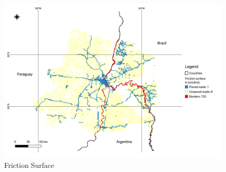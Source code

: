 \documentclass[11pt, a4paper]{report}
\begin{document}
\begin{figure}[H]
  \centering
  \includegraphics[width=0.9\linewidth]{figures/Friction Surface.png}
  \caption{Friction Surface}
  \label{fig:frictionsurface}
\end{figure}
\end{document}
